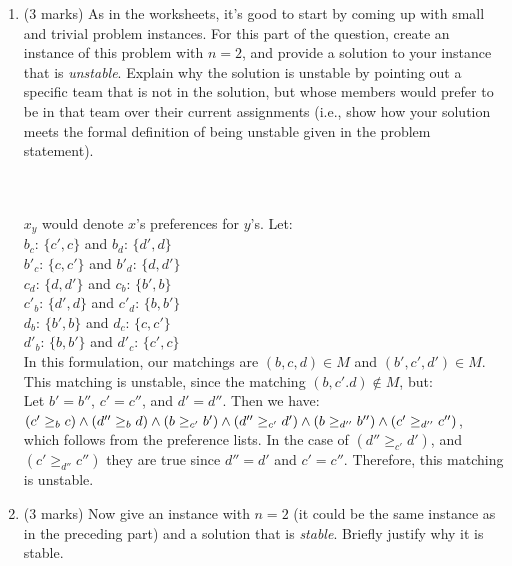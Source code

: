 \documentclass[11pt]{article}
\begin{document}
\begin{enumerate}
\item (3 marks)
As in the worksheets, it's good to start by coming up with small and trivial
problem instances.  For this part of the question, create an instance
of this problem with $n=2$, and provide a solution to your instance
that is \textit{unstable}.  Explain why the solution is unstable
by pointing out a specific team that is not in the solution, but whose
members would prefer to be in that team over their current assignments
(i.e., show how your solution meets the formal definition of being
unstable given in the problem statement).
\begin{soln}
    \\\\
    $x_y$ would denote $x$'s preferences for $y$'s. Let:\\
    $b_c$: $\{c', c\}$ and $b_d$: $\{d', d\}$ \\
    $b'_c$: $\{c, c'\}$ and $b'_d$: $\{d, d'\}$ \\
    $c_d$: $\{d, d'\}$ and $c_b$: $\{b', b\}$ \\
    $c'_{b}$: $\{d', d\}$ and $c'_{d}$: $\{b, b'\}$ \\
    $d_{b}$: $\{b', b\}$ and $d_{c}$: $\{c, c'\}$ \\
    $d'_{b}$: $\{b, b'\}$ and $d'_{c}$: $\{c', c\}$ \\
    
    In this formulation, our matchings are $(b, c, d) \in M$ and $(b', c', d') \in M$. This matching is unstable, since the matching $(b, c'. d) \notin M$, but: \\
    
    Let $b' = b''$, $c' = c''$, and $d' = d''$. Then we have: \\
    $(c' \geq_b c) \wedge (d'' \geq_b d) \\
    \wedge (b \geq_{c'} b') \wedge (d'' \geq_{c'} d') \\
    \wedge (b \geq_{d''} b'') \wedge (c' \geq_{d''} c'')$, \\
    which follows from the preference lists. In the case of $(d'' \geq_{c'} d')$, and $(c' \geq_{d''} c'')$ they are true since $d'' = d'$ and $c' = c''$. Therefore, this matching is unstable.
\end{soln}

\item (3 marks)
Now give an instance with $n=2$ (it could be the same instance as in
the preceding part) and a solution that is \textit{stable}.  Briefly
justify why it is stable.


\end{enumerate}
\end{document}
